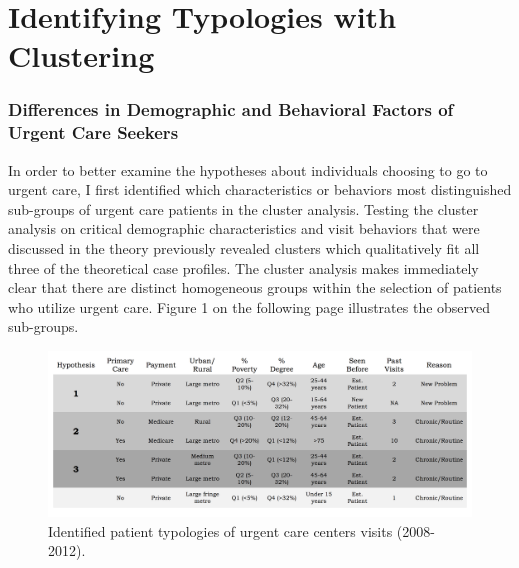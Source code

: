 \documentclass[12pt,twoside]{reedthesis}
\begin{document}
  \section*{Identifying Typologies with
  Clustering}\label{identifying-typologies-with-clustering}
  
  \subsubsection*{Differences in Demographic and Behavioral Factors of
  Urgent Care
  Seekers}\label{differences-in-demographic-and-behavioral-factors-of-urgent-care-seekers}
  
  In order to better examine the hypotheses about individuals choosing to
  go to urgent care, I first identified which characteristics or behaviors
  most distinguished sub-groups of urgent care patients in the cluster
  analysis. Testing the cluster analysis on critical demographic
  characteristics and visit behaviors that were discussed in the theory
  previously revealed clusters which qualitatively fit all three of the
  theoretical case profiles. The cluster analysis makes immediately clear
  that there are distinct homogeneous groups within the selection of
  patients who utilize urgent care. Figure 1 on the following page
  illustrates the observed sub-groups.
  
  \newpage
  
  \begin{figure}[h!]
  \centering
  \includegraphics[angle = 90,scale = 0.45]{figures/clusters.png}
  \caption[Identified patient typologies of urgent care centers visits (2008-2012).]{\small{Identified patient typologies of urgent care centers visits (2008-2012).}}
  \label{fig:clus1}
  \end{figure}
  
  \newpage
  
\end{document}
